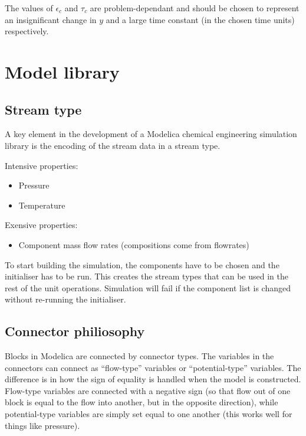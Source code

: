The values of $\epsilon_c$ and $\tau_c$ are problem-dependant and
should be chosen to represent an insignificant change in $y$ and a
large time constant (in the chosen time units) respectively.

\section{Model library}
\subsection{Stream type}
A key element in the development of a Modelica chemical engineering simulation
library is the encoding of the stream data in a stream type.  


Intensive properties:
\begin{itemize}
  \item Pressure
  \item Temperature
\end{itemize}

Exensive properties:
\begin{itemize}
  \item Component mass flow rates (compositions come from flowrates)
\end{itemize}

To start building the simulation, the components have to be chosen and the
initialiser has to be run.  This creates the stream types that can be used in
the rest of the unit operations.  Simulation will fail if the component list is
changed without re-running the initialiser.	

\subsection{Connector philiosophy}
Blocks in Modelica are connected by connector types.  The variables in the
connectors can connect as ``flow-type'' variables or ``potential-type''
variables.  The difference is in how the sign of equality is handled when the
model is constructed.  Flow-type variables are connected with a negative sign
(so that flow out of one block is equal to the flow into another, but in the
opposite direction), while potential-type variables are simply set equal to one
another (this works well for things like pressure).

